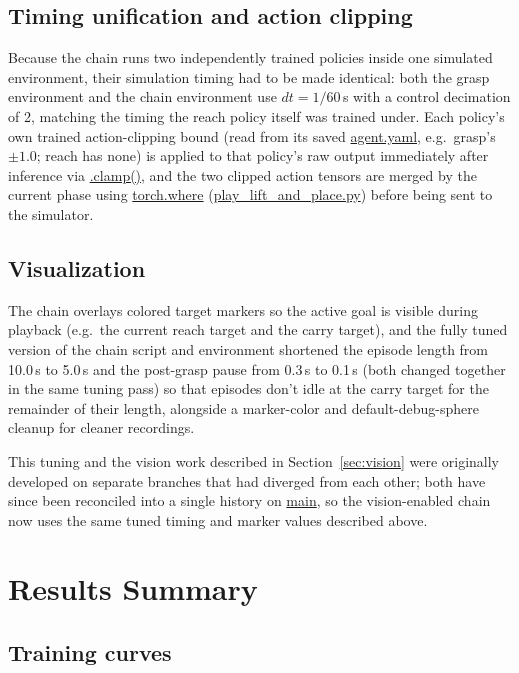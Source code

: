 \documentclass[11pt]{article}
\begin{document}
\subsection{Timing unification and action clipping}

Because the chain runs two independently trained policies inside one simulated
environment, their simulation timing had to be made identical: both the grasp
environment and the chain environment use $dt = 1/60$\,s with a control decimation
of 2, matching the timing the reach policy itself was trained under. Each policy's
own trained action-clipping bound (read from its saved \url{agent.yaml}, e.g.\
grasp's $\pm1.0$; reach has none) is applied to that policy's raw output immediately after
inference via \url{.clamp()}, and the two clipped action tensors are merged by the current phase
using \url{torch.where} (\url{play_lift_and_place.py}) before being sent to the simulator.

\subsection{Visualization}

The chain overlays colored target markers so the active goal is visible during
playback (e.g.\ the current reach target and the carry target), and the fully
tuned version of the chain script and environment shortened the episode length from
10.0\,s to 5.0\,s and the post-grasp pause from 0.3\,s to 0.1\,s
(both changed together in the same tuning pass)
so that episodes
don't idle at the carry target for the remainder of their length, alongside a
marker-color and default-debug-sphere cleanup for cleaner recordings.

This tuning and the vision work described in Section~\ref{sec:vision} were originally developed
on separate branches that had diverged from each other; both have since been
reconciled into a single history on \url{main}, so the vision-enabled chain now uses the same
tuned timing and marker values described above.

\section{Results Summary}
\label{sec:results}

\subsection{Training curves}
\end{document}

